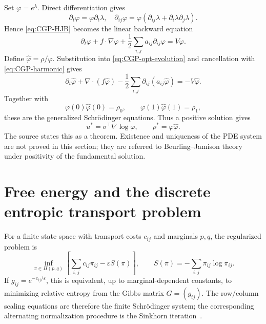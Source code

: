Set $\varphi=e^\lambda$.  Direct differentiation gives
\[
 \partial_t\varphi=\varphi\partial_t\lambda,
 \quad
 \partial_{ij}\varphi
 =\varphi(\partial_{ij}\lambda+
          \partial_i\lambda\partial_j\lambda).
\]
Hence \eqref{eq:CGP-HJB} becomes the linear backward equation
\begin{equation}
 \partial_t\varphi+f\cdot\nabla\varphi
 +\frac12\sum_{i,j}a_{ij}\partial_{ij}\varphi=V\varphi.
 \label{eq:CGP-harmonic}
\end{equation}
Define $\widehat\varphi=\rho/\varphi$.  Substitution into
\eqref{eq:CGP-opt-evolution} and cancellation with \eqref{eq:CGP-harmonic} gives
\begin{equation}
 \partial_t\widehat\varphi+\nabla\cdot(f\widehat\varphi)
 -\frac12\sum_{i,j}\partial_{ij}(a_{ij}\widehat\varphi)
 =-V\widehat\varphi.
 \label{eq:CGP-adjoint}
\end{equation}
Together with
\[
 \varphi(0)\widehat\varphi(0)=\rho_0,
 \qquad
 \varphi(1)\widehat\varphi(1)=\rho_1,
\]
these are the generalized Schr\"odinger equations.  Thus a positive solution gives
\[
 u^*=\sigma^\top\nabla\log\varphi,
 \qquad \rho^*=\varphi\widehat\varphi.
\]
The source states this as a theorem.  Existence and uniqueness of the PDE system are not proved in
this section; they are referred to Beurling--Jamison theory under positivity of the fundamental
solution.

\section{Free energy and the discrete entropic transport problem}
For a finite state space with transport costs $c_{ij}$ and marginals $p,q$, the regularized problem is
\begin{equation}
 \inf_{\pi\in\Pi(p,q)}
 \left[\sum_{i,j}c_{ij}\pi_{ij}-\varepsilon S(\pi)\right],
 \qquad
 S(\pi)=-\sum_{i,j}\pi_{ij}\log\pi_{ij}.
 \label{eq:CGP-discrete-regOT}
\end{equation}
If $g_{ij}=e^{-c_{ij}/\varepsilon}$, this is equivalent, up to marginal-dependent constants, to
minimizing relative entropy from the Gibbs matrix $G=(g_{ij})$.  The row/column scaling equations are therefore the finite Schr\"odinger system; the corresponding
alternating normalization procedure is the Sinkhorn iteration~\cite{Sinkhorn1964,SinkhornKnopp1967}.

